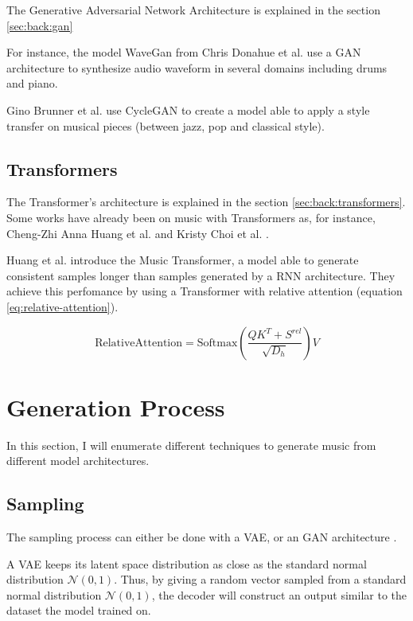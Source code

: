 \documentclass[12pt]{report}
\begin{document}
The Generative Adversarial Network Architecture is explained in the section \ref{sec:back:gan}

For instance, the model WaveGan from Chris Donahue et al. \cite{donahue_adversarial_2019} use a GAN architecture to synthesize audio waveform in several domains including drums and piano.

Gino Brunner et al. \cite{brunner_symbolic_2018} use CycleGAN \cite{zhu_unpaired_2018} to create a model able to apply a style transfer on musical pieces (between jazz, pop and classical style).

\subsection{Transformers}

The Transformer's architecture is explained in the section \ref{sec:back:transformers}.
Some works have already been on music with Transformers as, for instance, Cheng-Zhi Anna Huang et al. \cite{huang_music_2018} and Kristy Choi et al. \cite{choi_encoding_2019}.

Huang et al. introduce the Music Transformer, a model able to generate consistent samples longer than samples generated by a RNN architecture.
They achieve this perfomance by using a Transformer with relative attention (equation \ref{eq:relative-attention}).

\begin{equation}
    \text{RelativeAttention} = \text{Softmax} (\frac{QK^T + S^{rel}}{\sqrt{D_h}})V
    \label{eq:relative-attention}
\end{equation}

\section{Generation Process}
\label{sec:related-works:generation-process}

In this section, I will enumerate different techniques to generate music from different model architectures.

\subsection{Sampling}

The sampling process can either be done with a VAE, or an GAN architecture \cite{donahue_adversarial_2019}.

A VAE keeps its latent space distribution as close as the standard normal distribution $\mathcal{N}(0, 1)$.
Thus, by giving a random vector sampled from a standard normal distribution $\mathcal{N}(0, 1)$, the decoder will construct an output similar to the dataset the model trained on.
\end{document}
